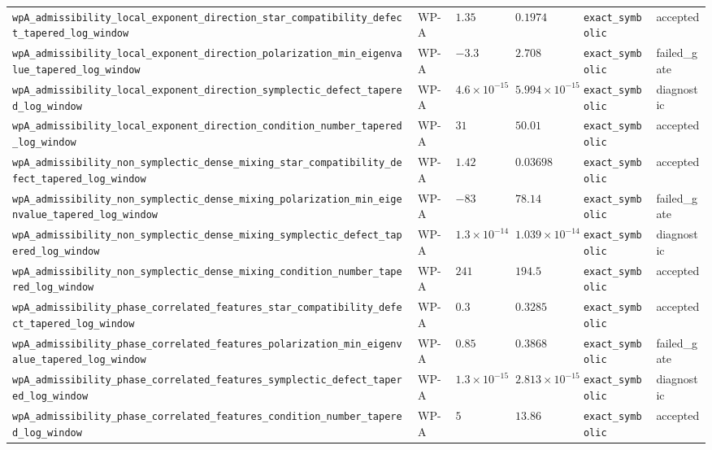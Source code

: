 \begin{table}[t]
\begin{tabular}{@{}llllll@{}}
\texttt{wpA\_admissibility\_local\_exponent\_direction\_star\_compatibility\_defect\_tapered\_log\_window} & WP-A & $1.35$ & $0.1974$ & \texttt{exact\_symbolic} & accepted \\
\texttt{wpA\_admissibility\_local\_exponent\_direction\_polarization\_min\_eigenvalue\_tapered\_log\_window} & WP-A & $-3.3$ & $2.708$ & \texttt{exact\_symbolic} & failed\_gate \\
\texttt{wpA\_admissibility\_local\_exponent\_direction\_symplectic\_defect\_tapered\_log\_window} & WP-A & $4.6\times10^{-15}$ & $5.994\times10^{-15}$ & \texttt{exact\_symbolic} & diagnostic \\
\texttt{wpA\_admissibility\_local\_exponent\_direction\_condition\_number\_tapered\_log\_window} & WP-A & $31$ & $50.01$ & \texttt{exact\_symbolic} & accepted \\
\texttt{wpA\_admissibility\_non\_symplectic\_dense\_mixing\_star\_compatibility\_defect\_tapered\_log\_window} & WP-A & $1.42$ & $0.03698$ & \texttt{exact\_symbolic} & accepted \\
\texttt{wpA\_admissibility\_non\_symplectic\_dense\_mixing\_polarization\_min\_eigenvalue\_tapered\_log\_window} & WP-A & $-83$ & $78.14$ & \texttt{exact\_symbolic} & failed\_gate \\
\texttt{wpA\_admissibility\_non\_symplectic\_dense\_mixing\_symplectic\_defect\_tapered\_log\_window} & WP-A & $1.3\times10^{-14}$ & $1.039\times10^{-14}$ & \texttt{exact\_symbolic} & diagnostic \\
\texttt{wpA\_admissibility\_non\_symplectic\_dense\_mixing\_condition\_number\_tapered\_log\_window} & WP-A & $241$ & $194.5$ & \texttt{exact\_symbolic} & accepted \\
\texttt{wpA\_admissibility\_phase\_correlated\_features\_star\_compatibility\_defect\_tapered\_log\_window} & WP-A & $0.3$ & $0.3285$ & \texttt{exact\_symbolic} & accepted \\
\texttt{wpA\_admissibility\_phase\_correlated\_features\_polarization\_min\_eigenvalue\_tapered\_log\_window} & WP-A & $0.85$ & $0.3868$ & \texttt{exact\_symbolic} & failed\_gate \\
\texttt{wpA\_admissibility\_phase\_correlated\_features\_symplectic\_defect\_tapered\_log\_window} & WP-A & $1.3\times10^{-15}$ & $2.813\times10^{-15}$ & \texttt{exact\_symbolic} & diagnostic \\
\texttt{wpA\_admissibility\_phase\_correlated\_features\_condition\_number\_tapered\_log\_window} & WP-A & $5$ & $13.86$ & \texttt{exact\_symbolic} & accepted \\

\end{tabular}
\end{table}
